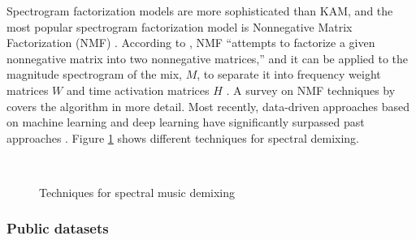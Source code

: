 \documentclass[report.tex]{subfiles}
\begin{document}
Spectrogram factorization models are more sophisticated than KAM, and the most popular spectrogram factorization model is Nonnegative Matrix Factorization (NMF) \parencite{musicmask, musicsepgood}. According to \citeauthor{musicsepgood}, NMF ``attempts to factorize a given nonnegative matrix into two nonnegative matrices,'' and it can be applied to the magnitude spectrogram of the mix, $M$, to separate it into frequency weight matrices $W$ and time activation matrices $H$ \parencite[37]{musicsepgood}. A survey on NMF techniques by \textcite{nmfpaper} covers the algorithm in more detail. Most recently, data-driven approaches based on machine learning and deep learning have significantly surpassed past approaches \parencite{musicsepgood, sisec2018}. Figure \ref{fig:spectraldemix} shows different techniques for spectral demixing.

\begin{figure}[ht]
	\centering
	\\
	\caption{Techniques for spectral music demixing \parencite[36, 38]{musicsepgood}}
	\label{fig:spectraldemix}
\end{figure}

\subsubsection{Public datasets}
\label{sec:musicsepdatasets}
\end{document}
